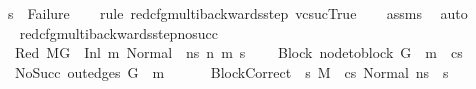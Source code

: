 \begin{isabellebody}
\ \ {\isachardoublequoteopen}s{\isacharprime}{\kern0pt}\ {\isasymnoteq}\ Failure{\isachardoublequoteclose}\isanewline
%
\isadelimproof
\ \ %
\endisadelimproof
%
\isatagproof
{}\isamarkupfalse%
\ {\isacharparenleft}{\kern0pt}rule\ red{\isacharunderscore}{\kern0pt}cfg{\isacharunderscore}{\kern0pt}multi{\isacharunderscore}{\kern0pt}backwards{\isacharunderscore}{\kern0pt}step{\isacharbrackleft}{\kern0pt}\ {\isacharquery}{\kern0pt}vcsuc{\isacharequal}{\kern0pt}True{\isacharbrackright}{\kern0pt}{\isacharparenright}{\kern0pt}\isanewline
\ \ \isamarkupfalse%
\ assms\ \isamarkupfalse%
\ auto%
\endisatagproof
{\isafoldproof}%
%
\isadelimproof
\ \ \isanewline
%
\endisadelimproof
\ \ \isanewline
\isanewline
{}\isamarkupfalse%
\ red{\isacharunderscore}{\kern0pt}cfg{\isacharunderscore}{\kern0pt}multi{\isacharunderscore}{\kern0pt}backwards{\isacharunderscore}{\kern0pt}step{\isacharunderscore}{\kern0pt}no{\isacharunderscore}{\kern0pt}succ{\isacharcolon}{\kern0pt}\isanewline
\ \ \isanewline
\ \ \ Red{\isacharcolon}{\kern0pt}\ {\isachardoublequoteopen}M{\isacharcomma}{\kern0pt}{\isasymLambda}{\isacharcomma}{\kern0pt}{\isasymGamma}{\isacharcomma}{\kern0pt}{\isasymOmega}{\isacharcomma}{\kern0pt}G\ {\isasymturnstile}\ {\isacharparenleft}{\kern0pt}Inl\ m{\isacharcomma}{\kern0pt}\ {\isacharparenleft}{\kern0pt}Normal\ \ n{\isacharunderscore}{\kern0pt}s{\isacharparenright}{\kern0pt}{\isacharparenright}{\kern0pt}\ {\isacharminus}{\kern0pt}n{\isasymrightarrow}{\isacharasterisk}{\kern0pt}\ {\isacharparenleft}{\kern0pt}m{\isacharprime}{\kern0pt}{\isacharcomma}{\kern0pt}\ s{\isacharprime}{\kern0pt}{\isacharparenright}{\kern0pt}{\isachardoublequoteclose}\ \isanewline
\ \ \ Block{\isacharcolon}{\kern0pt}\ {\isachardoublequoteopen}node{\isacharunderscore}{\kern0pt}to{\isacharunderscore}{\kern0pt}block\ G\ {\isacharbang}{\kern0pt}\ m\ {\isacharequal}{\kern0pt}\ cs{\isachardoublequoteclose}\ \isanewline
\ \ \ NoSucc{\isacharcolon}{\kern0pt}\ {\isachardoublequoteopen}out{\isacharunderscore}{\kern0pt}edges\ G\ {\isacharbang}{\kern0pt}\ m\ {\isacharequal}{\kern0pt}\ {\isacharbrackleft}{\kern0pt}{\isacharbrackright}{\kern0pt}{\isachardoublequoteclose}\ \isanewline
\ \ \ BlockCorrect{\isacharcolon}{\kern0pt}\ {\isachardoublequoteopen}{\isasymAnd}\ s{\isacharprime}{\kern0pt}{\isacharprime}{\kern0pt}{\isachardot}{\kern0pt}\ M{\isacharcomma}{\kern0pt}{\isasymLambda}{\isacharcomma}{\kern0pt}{\isasymGamma}{\isacharcomma}{\kern0pt}{\isasymOmega}\ {\isasymturnstile}\ {\isasymlangle}cs{\isacharcomma}{\kern0pt}\ Normal\ n{\isacharunderscore}{\kern0pt}s{\isasymrangle}\ {\isacharbrackleft}{\kern0pt}{\isasymrightarrow}{\isacharbrackright}{\kern0pt}\ s{\isacharprime}{\kern0pt}{\isacharprime}{\kern0pt}\ {\isasymLongrightarrow}\ \isanewline

\end{isabellebody}
